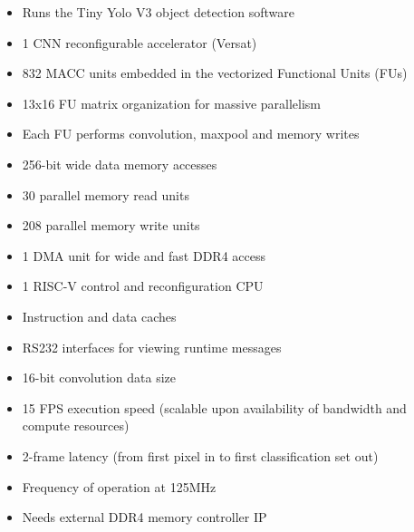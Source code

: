 \begin{itemize}
\item Runs the Tiny Yolo V3 object detection software
\item 1 CNN reconfigurable accelerator (Versat)
\item 832 MACC units embedded in the vectorized Functional Units (FUs)
\item 13x16 FU matrix organization for massive parallelism
\item Each FU performs convolution, maxpool and memory writes
\item 256-bit wide data memory accesses
\item 30 parallel memory read units
\item 208 parallel memory write units
\item 1 DMA unit for wide and fast DDR4 access 
\item 1 RISC-V control and reconfiguration CPU
\item Instruction and data caches
\item RS232 interfaces for viewing runtime messages
\item 16-bit convolution data size
\item 15 FPS execution speed (scalable upon availability of bandwidth and compute resources)
\item 2-frame latency (from first pixel in to first classification set out)
\item Frequency of operation at 125MHz
\item Needs external DDR4 memory controller IP
\end{itemize}
